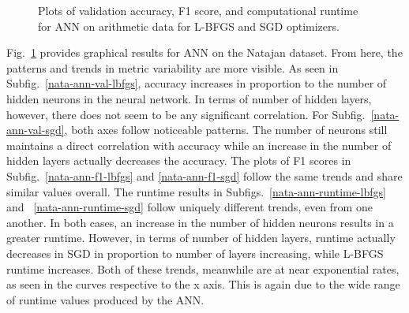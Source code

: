 \documentclass[12pt]{uthesis-v12}  %
\begin{document}
\begin{figure}
	\hfill	
{}
						
\caption{Plots of validation accuracy, F1 score, and computational runtime for ANN on arithmetic data for L-BFGS and SGD optimizers.}
	\label{ann-nata}
	\end{figure}

Fig.~\ref{ann-nata} provides graphical results for ANN on the Natajan dataset. From here, the patterns and trends in metric variability are more visible. As seen in 
Subfig.~\ref{nata-ann-val-lbfgs}, accuracy increases in proportion to the number of hidden neurons in the neural network. In terms of number of hidden layers, however, there does not seem to be any significant correlation. For 
Subfig.~\ref{nata-ann-val-sgd}, both axes follow noticeable patterns. The number of neurons still maintains a direct correlation with accuracy while an increase in the number of hidden layers actually decreases the accuracy. The plots of F1 scores in 
Subfig.~\ref{nata-ann-f1-lbfgs} and 
\ref{nata-ann-f1-sgd} follow the same trends and share similar values overall. The runtime results in 
Subfigs.~\ref{nata-ann-runtime-lbfgs} and 
~\ref{nata-ann-runtime-sgd} follow uniquely different trends, even from one another. In both cases, an increase in the number of hidden neurons results in a greater runtime. However, in terms of number of hidden layers, runtime actually decreases in SGD in proportion to number of layers increasing, while L-BFGS runtime increases. Both of these trends, meanwhile are at near exponential rates, as seen in the curves respective to the x axis. This is again due to the wide range of runtime values produced by the ANN.
\end{document}
